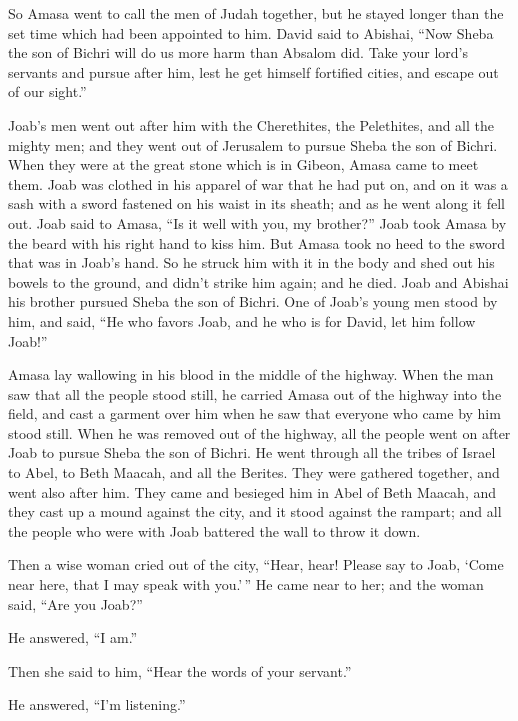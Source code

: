  So Amasa went to call the men of Judah together, but he
stayed longer than the set time which had been appointed to him.
 David said to Abishai, ``Now Sheba the son of Bichri will
do us more harm than Absalom did. Take your lord's servants and pursue
after him, lest he get himself fortified cities, and escape out of our
sight.''

 Joab's men went out after him with the Cherethites, the
Pelethites, and all the mighty men; and they went out of Jerusalem to
pursue Sheba the son of Bichri.  When they were at the great
stone which is in Gibeon, Amasa came to meet them. Joab was clothed in
his apparel of war that he had put on, and on it was a sash with a sword
fastened on his waist in its sheath; and as he went along it fell out.
 Joab said to Amasa, ``Is it well with you, my brother?''
Joab took Amasa by the beard with his right hand to kiss him.
 But Amasa took no heed to the sword that was in Joab's
hand. So he struck him with it in the body and shed out his bowels to
the ground, and didn't strike him again; and he died. Joab and Abishai
his brother pursued Sheba the son of Bichri.  One of Joab's
young men stood by him, and said, ``He who favors Joab, and he who is
for David, let him follow Joab!''

 Amasa lay wallowing in his blood in the middle of the
highway. When the man saw that all the people stood still, he carried
Amasa out of the highway into the field, and cast a garment over him
when he saw that everyone who came by him stood still. 
When he was removed out of the highway, all the people went on after
Joab to pursue Sheba the son of Bichri.  He went through
all the tribes of Israel to Abel, to Beth Maacah, and all the Berites.
They were gathered together, and went also after him.  They
came and besieged him in Abel of Beth Maacah, and they cast up a mound
against the city, and it stood against the rampart; and all the people
who were with Joab battered the wall to throw it down.

 Then a wise woman cried out of the city, ``Hear, hear!
Please say to Joab, `Come near here, that I may speak with you.'\,''
 He came near to her; and the woman said, ``Are you Joab?''

He answered, ``I am.''

Then she said to him, ``Hear the words of your servant.''

He answered, ``I'm listening.''

